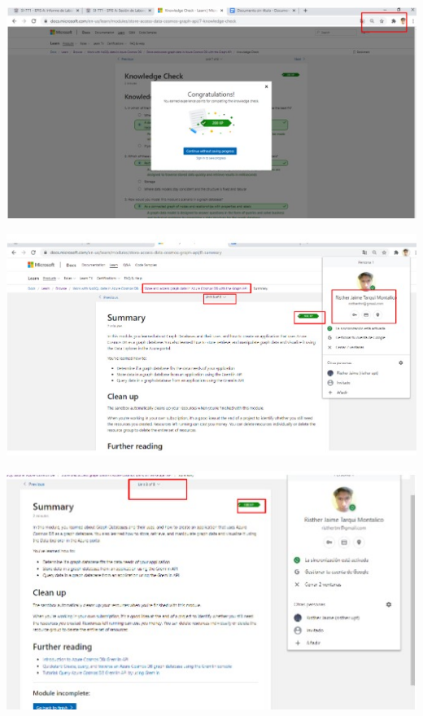 \documentclass[12pt,letterpaper]{article}
\begin{document}
\begin{enumerate}
	\begin{center}
		\includegraphics[width=14cm]{./img/f2.jpg} 
	\end{center}
	\begin{center}
		\includegraphics[width=14cm]{./img/f3.jpg} 
	\end{center}
	\begin{center}
		\includegraphics[width=14cm]{./img/f4.jpg} 
	\end{center}
	
	
\end{enumerate}
	
\end{document}

